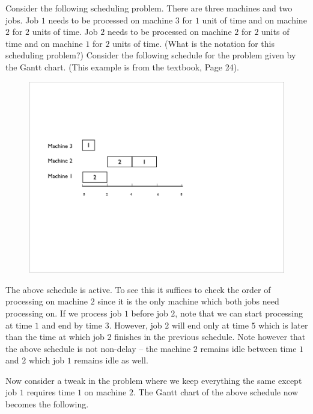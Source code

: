\documentclass[11pt]{article}
\begin{document}
Consider the following scheduling problem. There are three machines and two jobs. Job $1$ needs to be processed on machine $3$ for 
$1$ unit of time and on machine $2$ for $2$ units of time. Job $2$ needs to be processed on machine $2$ for $2$ units of time and on machine $1$ for $2$ units of time. (What is the notation for this scheduling problem?) Consider the following schedule for the problem
given by the Gantt chart. (This example is from the textbook, Page 24).

\begin{figure}[h]
\begin{center}
\includegraphics[scale=0.4]{active-schedule}
\end{center}
\end{figure}

The above schedule is active. To see this it suffices to check the order of processing on machine $2$ since it is the only machine which both jobs need processing on. If we process job $1$ before job $2$, note that we can start processing at time $1$ and end by time $3$.
However, job $2$ will end only at time $5$ which is later than the time at which job $2$ finishes in the previous schedule. Note however that the above schedule is not non-delay -- the machine $2$ remains idle between time $1$ and $2$ which job $1$ remains idle as well. 

Now consider a tweak in the problem where we keep everything the same except job $1$ requires time $1$ on machine $2$. The Gantt chart of the above schedule now becomes the following.
\end{document}
